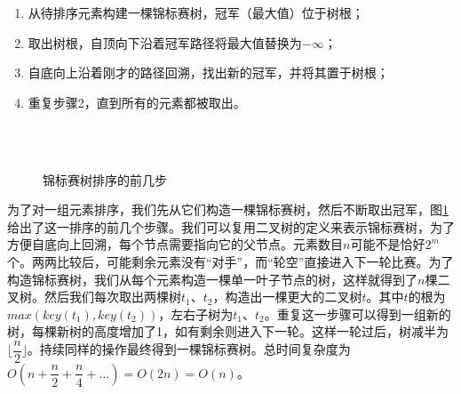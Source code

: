 \documentclass[b5paper]{ctexart}
\begin{document}
\begin{enumerate}
\item 从待排序元素构建一棵锦标赛树，冠军（最大值）位于树根；
\item 取出树根，自顶向下沿着冠军路径将最大值替换为$-\infty$；
\item 自底向上沿着刚才的路径回溯，找出新的冠军，并将其置于树根；
\item 重复步骤2，直到所有的元素都被取出。
\end{enumerate}

\captionsetup[subfigure]{labelformat=empty, margin=10pt}
\begin{figure}[htbp]
  \centering
   \\
   \\
  \caption{锦标赛树排序的前几步}
  \label{fig:tournament-tree-4}
\end{figure}
\captionsetup[subfigure]{labelformat=parens}

为了对一组元素排序，我们先从它们构造一棵锦标赛树，然后不断取出冠军，图\ref{fig:tournament-tree-4}给出了这一排序的前几个步骤。我们可以复用二叉树的定义来表示锦标赛树，为了方便自底向上回溯，每个节点需要指向它的父节点。元素数目$n$可能不是恰好$2^m$个。两两比较后，可能剩余元素没有“对手”，而“轮空”直接进入下一轮比赛。为了构造锦标赛树，我们从每个元素构造一棵单一叶子节点的树，这样就得到了$n$棵二叉树。然后我们每次取出两棵树$t_1$、$t_2$，构造出一棵更大的二叉树$t$。其中$t$的根为$max(key(t_1), key(t_2))$，左右子树为$t_1$、$t_2$。重复这一步骤可以得到一组新的树，每棵新树的高度增加了1，如有剩余则进入下一轮。这样一轮过后，树减半为$\lfloor \dfrac{n}{2} \rfloor$。持续同样的操作最终得到一棵锦标赛树。总时间复杂度为$O(n + \dfrac{n}{2} + \dfrac{n}{4} + ... ) = O(2n) = O(n)$。
\end{document}
